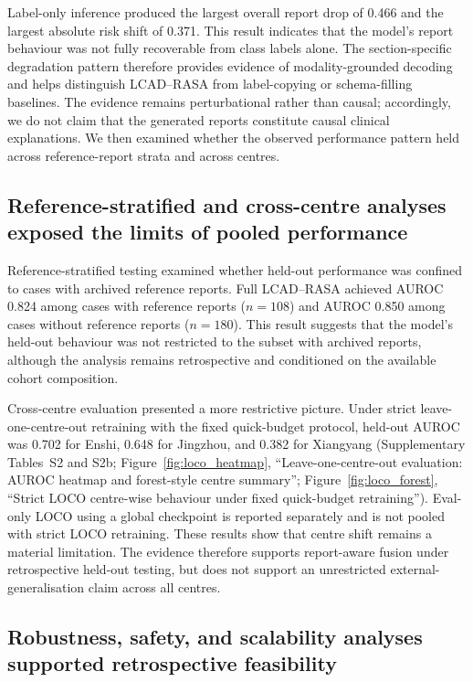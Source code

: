 Label-only inference produced the largest overall report drop of 0.466 and the largest absolute risk shift of 0.371. This result indicates that the model's report behaviour was not fully recoverable from class labels alone. The section-specific degradation pattern therefore provides evidence of modality-grounded decoding and helps distinguish LCAD--RASA from label-copying or schema-filling baselines. The evidence remains perturbational rather than causal; accordingly, we do not claim that the generated reports constitute causal clinical explanations. We then examined whether the observed performance pattern held across reference-report strata and across centres.

\subsection{Reference-stratified and cross-centre analyses exposed the limits of pooled performance}
\label{subsec:loco_results}

Reference-stratified testing examined whether held-out performance was confined to cases with archived reference reports. Full LCAD--RASA achieved AUROC 0.824 among cases with reference reports ($n=108$) and AUROC 0.850 among cases without reference reports ($n=180$). This result suggests that the model's held-out behaviour was not restricted to the subset with archived reports, although the analysis remains retrospective and conditioned on the available cohort composition.

Cross-centre evaluation presented a more restrictive picture. Under strict leave-one-centre-out retraining with the fixed quick-budget protocol, held-out AUROC was 0.702 for Enshi, 0.648 for Jingzhou, and 0.382 for Xiangyang (Supplementary Tables~S2 and S2b; Figure~\ref{fig:loco_heatmap}, ``Leave-one-centre-out evaluation: AUROC heatmap and forest-style centre summary''; Figure~\ref{fig:loco_forest}, ``Strict LOCO centre-wise behaviour under fixed quick-budget retraining''). Eval-only LOCO using a global checkpoint is reported separately and is not pooled with strict LOCO retraining. These results show that centre shift remains a material limitation. The evidence therefore supports report-aware fusion under retrospective held-out testing, but does not support an unrestricted external-generalisation claim across all centres.

\subsection{Robustness, safety, and scalability analyses supported retrospective feasibility}
\label{subsec:robustness_safety_scalability}

